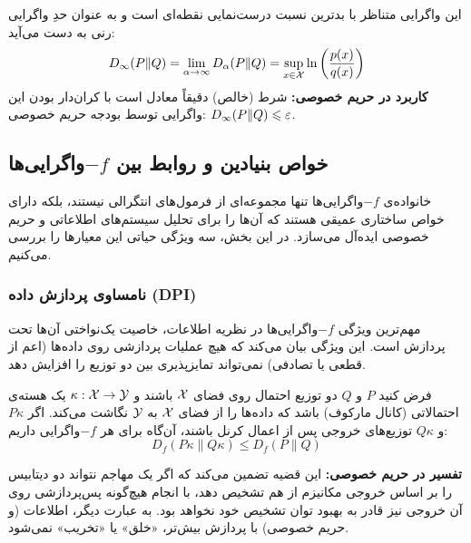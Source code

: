 \begin{تعریف}
\label{def:maxdiv}
این واگرایی متناظر با بدترین نسبت درست‌نمایی نقطه‌ای است و به عنوان حدِ واگرایی رنی به دست می‌آید:
\begin{equation}
D_\infty(P \| Q) = \lim_{\alpha \to \infty} D_\alpha(P \| Q) = \sup_{x \in \Xset} \ln \left(\frac{p(x)}{q(x)}\right)
\end{equation}
\textbf{کاربرد در حریم خصوصی:}
    شرط \DP (خالص) دقیقاً معادل است با کران‌دار بودن این واگرایی توسط بودجه حریم خصوصی: $D_\infty(P \| Q) \leqslant \varepsilon$.




\end{تعریف}
\subsection{خواص بنیادین و روابط بین $-f$واگرایی‌ها}
\label{sec:bg:f-div-properties}

خانواده‌ی $-f$واگرایی‌ها تنها مجموعه‌ای از فرمول‌های انتگرالی نیستند، بلکه دارای خواص ساختاری عمیقی هستند که آن‌ها را برای تحلیل سیستم‌های اطلاعاتی و حریم خصوصی ایده‌آل می‌سازد. در این بخش، سه ویژگی حیاتی این معیارها را بررسی می‌کنیم.

\subsubsection{نامساوی پردازش داده (DPI)}
مهم‌ترین ویژگی $-f$واگرایی‌ها در نظریه اطلاعات، خاصیت یک‌نواختی آن‌ها تحت پردازش است. این ویژگی بیان می‌کند که هیچ عملیات پردازشی روی داده‌ها (اعم از قطعی یا تصادفی) نمی‌تواند تمایزپذیری بین دو توزیع را افزایش دهد.

\begin{قضیه}
فرض کنید $P$ و $Q$ دو توزیع احتمال روی فضای $\Xset$ باشند و $\kappa: \Xset \to \Yset$ یک هسته‌ی احتمالاتی (کانال مارکوف) باشد که داده‌ها را از فضای $\Xset$ به $\Yset$ نگاشت می‌کند. اگر $P\kappa$ و $Q\kappa$ توزیع‌های خروجی پس از اعمال کرنل باشند، آن‌گاه برای هر $-f$واگرایی داریم:
\begin{equation}
D_f(P\kappa \| Q\kappa) \le D_f(P \| Q)
\end{equation}
\end{قضیه}

\textbf{تفسیر در حریم خصوصی:} این قضیه تضمین می‌کند که اگر یک مهاجم نتواند دو دیتابیس را بر اساس خروجی مکانیزم از هم تشخیص دهد، با انجام هیچ‌گونه پس‌پردازشی روی آن خروجی نیز قادر به بهبود توان تشخیص خود نخواهد بود. به عبارت دیگر، اطلاعات (و حریم خصوصی) با پردازش بیش‌تر، «خلق» یا «تخریب» نمی‌شود.

